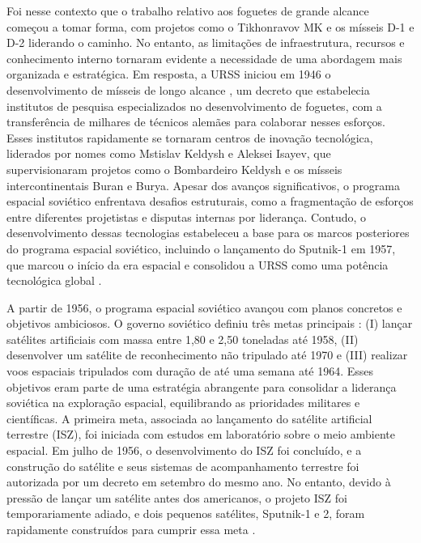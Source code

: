 Foi nesse contexto que o trabalho relativo aos foguetes de grande alcance começou a tomar forma, com projetos como o Tikhonravov MK e os mísseis D-1 e D-2 liderando o caminho. No entanto, as limitações de infraestrutura, recursos e conhecimento interno tornaram evidente a necessidade de uma abordagem mais organizada e estratégica. Em resposta, a URSS iniciou em 1946 o desenvolvimento de mísseis de longo alcance \cite{siddiqi2004}, um decreto que estabelecia institutos de pesquisa especializados no desenvolvimento de foguetes, com a transferência de milhares de técnicos alemães para colaborar nesses esforços. Esses institutos rapidamente se tornaram centros de inovação tecnológica, liderados por nomes como Mstislav Keldysh e Aleksei Isayev, que supervisionaram projetos como o Bombardeiro Keldysh e os mísseis intercontinentais Buran e Burya. Apesar dos avanços significativos, o programa espacial soviético enfrentava desafios estruturais, como a fragmentação de esforços entre diferentes projetistas e disputas internas por liderança. Contudo, o desenvolvimento dessas tecnologias estabeleceu a base para os marcos posteriores do programa espacial soviético, incluindo o lançamento do Sputnik-1 em 1957, que marcou o início da era espacial e consolidou a URSS como uma potência tecnológica global \cite{betzler2024}.

A partir de 1956, o programa espacial soviético avançou com planos concretos e objetivos ambiciosos. O governo soviético definiu três metas principais \cite{betzler2024}: (I) lançar satélites artificiais com massa entre 1,80 e 2,50 toneladas até 1958, (II) desenvolver um satélite de reconhecimento não tripulado até 1970 e (III) realizar voos espaciais tripulados com duração de até uma semana até 1964. Esses objetivos eram parte de uma estratégia abrangente para consolidar a liderança soviética na exploração espacial, equilibrando as prioridades militares e científicas. A primeira meta, associada ao lançamento do satélite artificial terrestre (ISZ), foi iniciada com estudos em laboratório sobre o meio ambiente espacial. Em julho de 1956, o desenvolvimento do ISZ foi concluído, e a construção do satélite e seus sistemas de acompanhamento terrestre foi autorizada por um decreto em setembro do mesmo ano. No entanto, devido à pressão de lançar um satélite antes dos americanos, o projeto ISZ foi temporariamente adiado, e dois pequenos satélites, Sputnik-1 e 2, foram rapidamente construídos para cumprir essa meta \cite{betzler2024}.

